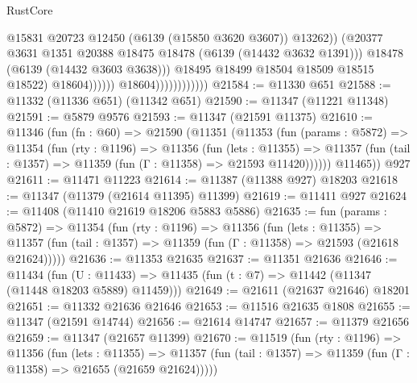 \begin{lexlean}{RustCore}
\begin{coremodule}
                                                @15831
                                                @20723
                                                @12450
                                                (@6139 (@15850 @3620 @3607))
                                                @13262))
                                            (@20377
                                              @3631
                                              @1351
                                              @20388
                                              @18475
                                              @18478
                                              (@6139 (@14432 @3632 @1391)))
                                            @18478
                                            (@6139 (@14432 @3603 @3638)))
                                          @18495
                                          @18499
                                          @18504
                                          @18509
                                          @18515
                                          @18522)
                                        @18604))))))
                            @18604))))))))))))
@21584 := @11330 @651
@21588 := @11332 (@11336 @651) (@11342 @651)
@21590 := @11347 (@11221 @11348)
@21591 := @5879 @9576
@21593 := @11347 (@21591 @11375)
@21610 := @11346
    (fun (fn : @60) =>
    @21590
      (@11351
        (@11353
          (fun (params : @5872) =>
          @11354
            (fun (rty : @1196) =>
            @11356
              (fun (lets : @11355) =>
              @11357 (fun (tail : @1357) => @11359 (fun (Γ : @11358) => @21593 @11420))))))
        @11465))
    @927
@21611 := @11471 @11223
@21614 := @11387 (@11388 @927) @18203
@21618 := @11347 (@11379 (@21614 @11395) @11399)
@21619 := @11411 @927
@21624 := @11408 (@11410 @21619 @18206 @5883 @5886)
@21635 := fun (params : @5872) =>
  @11354
    (fun (rty : @1196) =>
    @11356
      (fun (lets : @11355) =>
      @11357 (fun (tail : @1357) => @11359 (fun (Γ : @11358) => @21593 (@21618 @21624)))))
@21636 := @11353 @21635
@21637 := @11351 @21636
@21646 := @11434
    (fun (U : @11433) => @11435 (fun (t : @7) => @11442 (@11347 (@11448 @18203 @5889) @11459)))
@21649 := @21611 (@21637 @21646) @18201
@21651 := @11332 @21636 @21646
@21653 := @11516 @21635 @1808
@21655 := @11347 (@21591 @14744)
@21656 := @21614 @14747
@21657 := @11379 @21656
@21659 := @11347 (@21657 @11399)
@21670 := @11519
    (fun (rty : @1196) =>
    @11356
      (fun (lets : @11355) =>
      @11357 (fun (tail : @1357) => @11359 (fun (Γ : @11358) => @21655 (@21659 @21624)))))

\end{coremodule}
\end{lexlean}
